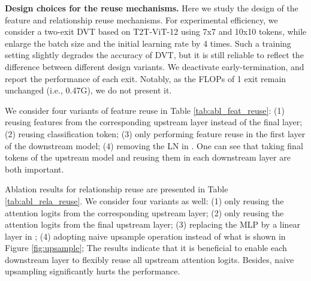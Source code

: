 \documentclass{article}
\begin{document}
\textbf{Design choices for the reuse mechanisms.}
Here we study the design of the feature and relationship reuse mechanisms. For experimental efficiency, we consider a two-exit DVT based on T2T-ViT-12 using 7x7 and 10x10 tokens, while enlarge the batch size and the initial learning rate by 4 times. Such a training setting slightly degrades the accuracy of DVT, but it is still reliable to reflect the difference between different design variants. We deactivate early-termination, and report the performance of each exit. Notably, as the FLOPs of 1 exit remain unchanged (i.e., 0.47G), we do not present it.

We consider four variants of feature reuse in Table \ref{tab:abl_feat_reuse}: 
(1) reusing features from the corresponding upstream layer instead of the final layer; 
(2) reusing classification token; 
(3) only performing feature reuse in the first layer of the downstream model; 
(4) removing the LN in . 
One can see that taking final tokens of the upstream model and reusing them in each downstream layer are both important.


{Ablation results for relationship reuse}
are presented in Table \ref{tab:abl_rela_reuse}. We consider four variants as well: 
(1) only reusing the attention logits from the corresponding upstream layer; 
(2) only reusing the attention logits from the final upstream layer; 
(3) replacing the MLP by a linear layer in ; 
(4) adopting naive upsample operation instead of what is shown in Figure \ref{fig:upsample}; 
The results indicate that it is beneficial to enable each downstream layer to flexibly reuse all upstream attention logits. Besides, naive upsampling significantly hurts the performance.
\end{document}
